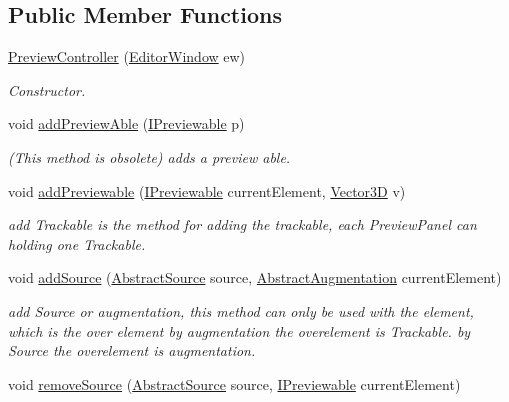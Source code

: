 \subsection*{Public Member Functions}
\begin{DoxyCompactItemize}
\item 
\hyperlink{class_preview_controller_aa43765e04846c1d954bf7e0c5b1cc279}{Preview\-Controller} (\hyperlink{class_a_rdev_kit_1_1_editor_window}{Editor\-Window} ew)
\begin{DoxyCompactList}\small\item\em Constructor. \end{DoxyCompactList}\item 
void \hyperlink{class_preview_controller_a87e93818ed39df3e7accac5999a85d21}{add\-Preview\-Able} (\hyperlink{interface_a_rdev_kit_1_1_model_1_1_project_1_1_i_previewable}{I\-Previewable} p)
\begin{DoxyCompactList}\small\item\em (This method is obsolete) adds a preview able. \end{DoxyCompactList}\item 
void \hyperlink{class_preview_controller_ae3d0ace09aed4464a7dd91764d1bb03e}{add\-Previewable} (\hyperlink{interface_a_rdev_kit_1_1_model_1_1_project_1_1_i_previewable}{I\-Previewable} current\-Element, \hyperlink{class_a_rdev_kit_1_1_model_1_1_project_1_1_vector3_d}{Vector3\-D} v)
\begin{DoxyCompactList}\small\item\em add Trackable is the method for adding the trackable, each Preview\-Panel can holding one Trackable. \end{DoxyCompactList}\item 
void \hyperlink{class_preview_controller_aa4cc8c02192eb08afe244825d5796552}{add\-Source} (\hyperlink{class_a_rdev_kit_1_1_model_1_1_project_1_1_abstract_source}{Abstract\-Source} source, \hyperlink{class_a_rdev_kit_1_1_model_1_1_project_1_1_abstract_augmentation}{Abstract\-Augmentation} current\-Element)
\begin{DoxyCompactList}\small\item\em add Source or augmentation, this method can only be used with the element, which is the over element by augmentation the overelement is Trackable. by Source the overelement is augmentation. \end{DoxyCompactList}\item 
void \hyperlink{class_preview_controller_a4fad890882bdd075b6ea97ebac62bff6}{remove\-Source} (\hyperlink{class_a_rdev_kit_1_1_model_1_1_project_1_1_abstract_source}{Abstract\-Source} source, \hyperlink{interface_a_rdev_kit_1_1_model_1_1_project_1_1_i_previewable}{I\-Previewable} current\-Element)

\end{DoxyCompactItemize}
